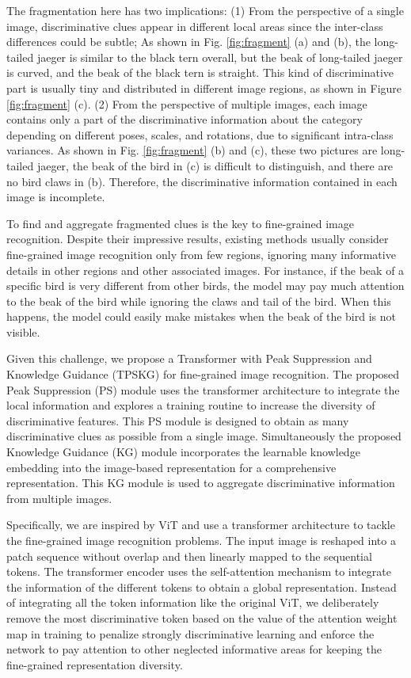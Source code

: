 \documentclass[5p,twocolumn]{elsarticle}
\begin{document}
The fragmentation here has two implications: (1) From the perspective of a single image, discriminative clues appear in different local areas since the inter-class differences could be subtle; As shown in Fig. \ref{fig:fragment} (a) and (b), the long-tailed jaeger is similar to the black tern overall, but the beak of long-tailed jaeger is curved, and the beak of the black tern is straight. This kind of discriminative part is usually tiny and distributed in different image regions, as shown in Figure \ref{fig:fragment} (c). (2) From the perspective of multiple images, each image contains only a part of the discriminative information about the category depending on different poses, scales, and rotations, due to significant intra-class variances.  As shown in Fig. \ref{fig:fragment} (b) and (c), these two pictures are long-tailed jaeger, the beak of the bird in (c) is difficult to distinguish, and there are no bird claws in (b). Therefore, the discriminative information contained in each image is incomplete. 

To find and aggregate fragmented clues is the key to fine-grained image recognition.
Despite their impressive results, existing methods usually consider fine-grained image recognition only from few regions, ignoring many informative details in other regions and other associated images. For instance, if the beak of a specific bird is very different from other birds, the model may pay much attention to the beak of the bird while ignoring the claws and tail of the bird. When this happens, the model could easily make mistakes when the beak of the bird is not visible. 


Given this challenge, we propose a Transformer with Peak Suppression and Knowledge Guidance (TPSKG) for fine-grained image recognition. The proposed Peak Suppression (PS) module uses the transformer architecture to integrate the local information and explores a training routine to increase the diversity of discriminative features. This PS module is designed to obtain as many discriminative clues as possible from a single image. Simultaneously the proposed Knowledge Guidance (KG) module incorporates the learnable knowledge embedding into the image-based representation for a comprehensive representation. This KG module is used to aggregate discriminative information from multiple images. 

Specifically, we are inspired by ViT \cite{Dosovitskiy2021Image} and use a transformer architecture to tackle the fine-grained image recognition problems. The input image is reshaped into a patch sequence without overlap and then linearly mapped to the sequential tokens. The transformer encoder uses the self-attention mechanism to integrate the information of the different tokens to obtain a global representation. Instead of integrating all the token information like the original ViT, we deliberately remove the most discriminative token based on the value of the attention weight map in training to penalize strongly discriminative learning and enforce the network to pay attention to other neglected informative areas for keeping the fine-grained representation diversity.
 
\end{document}
